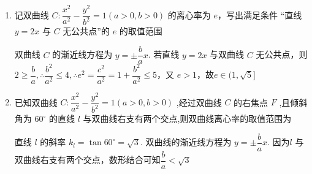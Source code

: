 \begin{enumerate}
\begin{enumerate}
\begin{enumerate}
\begin{jieda}
                所以 $C$ 的离心率 $e = \dfrac{c}{a} = \dfrac{2c}{2a} = \dfrac{\left| {F}_{1}{F}_{2}\right| }{\left| {P{F}_{1}}\right|  - \left| {P{F}_{2}}\right| }= \dfrac{\sqrt{7}m}{2m} = \dfrac{\sqrt{7}}{2}$ .
            \end{jieda}
            \item 记双曲线 $C : \dfrac{{x}^{2}}{{a}^{2}} - \dfrac{{y}^{2}}{{b}^{2}} = 1\left( {a > 0,b > 0}\right)$ 的离心率为 $e$，写出满足条件 “直线 $y = {2x}$ 与 $C$ 无公共点”的 $e$ 的取值范围\blkda{$\left( 1,\sqrt{5}\right]$}
            \begin{jieda}
                双曲线 $C$ 的渐近线方程为 $y =  \pm  \dfrac{b}{a}x$. 若直线 $y = {2x}$ 与双曲线 $C$ 无公共点，则 $2 \geq  \dfrac{b}{a},\therefore \dfrac{{b}^{2}}{{a}^{2}} \leq  4,\therefore {e}^{2} = \dfrac{{c}^{2}}{{a}^{2}} = 1 + \dfrac{{b}^{2}}{{a}^{2}} \leq  5$，又 $e > 1$，故$e \in  (1,\sqrt{5}\rbrack$
            \end{jieda}
            \item 已知双曲线 $C : \dfrac{{x}^{2}}{{a}^{2}} - \dfrac{{y}^{2}}{{b}^{2}} = 1\left( {a > 0,b > 0}\right)$ ,经过双曲线 $C$ 的右焦点 $F$ ,且倾斜角为 ${60}^{ \circ  }$ 的直线 $l$ 与双曲线右支有两个交点,则双曲线离心率的取值范围为
            \begin{jieda}
                直线 $l$ 的斜率 ${k}_{l} = \tan {60}^{ \circ  } = \sqrt{3}$. 双曲线的渐近线方程为 $y =  \pm  \dfrac{b}{a}x$.
                因为$l$ 与双曲线右支有两个交点，数形结合可知$\dfrac{b}{a} < \sqrt{3}$
                

\end{jieda}
\end{enumerate}
\end{enumerate}
\end{enumerate}

